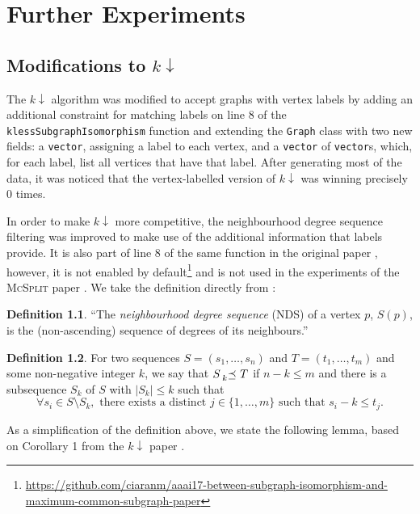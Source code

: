 \documentclass{l4proj}
\theoremstyle{definition}
\newtheorem{definition}{Definition}[chapter]
\theoremstyle{remark}
\newcommand{\kprec}[1]{\prescript{}{#1}{\preceq}\ }
\begin{document}
\chapter{Further Experiments}
\section{Modifications to \texorpdfstring{$k\downarrow$}{kdown}}

The $k\downarrow$ algorithm was modified to accept graphs with vertex
labels by adding an additional constraint for matching labels on line 8 of the
\texttt{klessSubgraphIsomorphism} function \cite{DBLP:conf/aaai/HoffmannMR17}
and extending the \texttt{Graph} class with two new fields: a \texttt{vector},
assigning a label to each vertex, and a \texttt{vector} of \texttt{vector}s,
which, for each label, list all vertices that have that label. After generating
most of the data, it was noticed that the vertex-labelled version of
$k\downarrow$ was winning precisely 0 times.

In order to make $k\downarrow$ more competitive, the neighbourhood degree
sequence filtering was improved to make use of the additional information that
labels provide. It is also part of line 8 of the same function in the original
paper \cite{DBLP:conf/aaai/HoffmannMR17}, however, it is not enabled by
default\footnote{\url{https://github.com/ciaranm/aaai17-between-subgraph-isomorphism-and-maximum-common-subgraph-paper}}
and is not used in the experiments of the \textsc{McSplit} paper
\cite{DBLP:conf/ijcai/McCreeshPT17}. We take the definition directly from
\cite{DBLP:conf/aaai/HoffmannMR17}:

\begin{definition}
  ``The \emph{neighbourhood degree sequence} (NDS) of a vertex $p$, $S(p)$, is the
  (non-ascending) sequence of degrees of its neighbours.''
\end{definition}

\begin{definition} \label{def:prec}
  For two sequences $S = (s_1, \dots, s_n)$ and $T = (t_1, \dots, t_m)$ and some
  non-negative integer $k$, we say that $S \kprec{k} T$ if $n - k \le m$ and
  there is a subsequence $S_k$ of $S$ with $|S_k| \le k$ such that
  \cite{DBLP:conf/aaai/HoffmannMR17}
  \[ \forall s_i \in S \setminus S_k, \text{ there exists a distinct } j \in \{
    1, \dots, m \} \text{ such that } s_i - k \le t_j. \]
\end{definition}

As a simplification of the definition above, we state the following lemma, based
on Corollary 1 from the $k\downarrow$ paper \cite{DBLP:conf/aaai/HoffmannMR17}.
\end{document}
